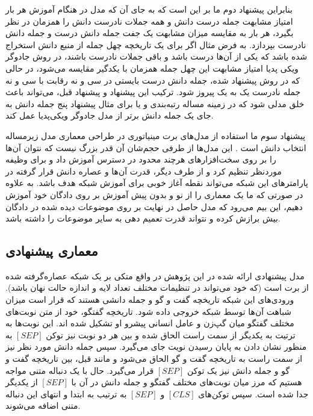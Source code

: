 بنابراین پیشنهاد دوم ما بر این است که به جای آن که مدل در هنگام آموزش هر بار امتیاز مشابهت جمله درست دانش و همه جملات نادرست دانش را همزمان در نظر بگیرد، هر بار به مقایسه میزان مشابهت یک جفت جمله دانش درست و جمله دانش نادرست بپردازد. به فرض مثال اگر برای یک تاریخچه چهل جمله از منبع دانش استخراج شده باشد که یکی از آن‌ها درست باشد و باقی جملات نادرست باشند، در روش جادوگر ویکی پدیا امتیاز مشابهت این چهل جمله همزمان با یکدگیر مقایسه می‌شود، در حالی که در روش پیشنهاد شده، جمله دانش درست بایستی در سی و نه رقابت با سی و نه جمله نادرست یک به یک پیروز شود. ترکیب این پیشنهاد 
و پیشنهاد قبل، می‌تواند باعث خلق مدلی شود که در زمینه مساله رتبه‌بندی 
و یا برای مثال پیشنهاد پنج جمله دانش به جای یک جمله دانش
برتر از مدل جادوگر ویکی‌پدیا عمل کند.

پیشنهاد سوم ما استفاده از مدل‌های برت مینیاتوری در طراحی معماری مدل زیرمساله انتخاب دانش است
\cite{turc2019well}.
این مدل‌ها از طرفی حجم‌شان آن قدر بزرگ نیست که نتوان آن‌ها را بر روی سخت‌افزار‌های هرچند محدود در دسترس آموزش داد و برای وظیفه موردنظر تنظیم کرد و از طرف دیگر، قدرت آ‌ن‌ها و عصاره دانش قرار گرفته در پارامتر‌های این شبکه می‌تواند نقطه آغاز خوبی برای آموزش شبکه هدف باشد. به علاوه در صورتی که ما یک معماری را از نو و بدون پیش آموزش بر روی دادگان خود آموزش دهیم، این بیم می‌رود که مدل حاصل در نهایت بر روی موضوعات دیده شده در دادگان بیش برازش کرده و نتواند قدرت تعمیم دهی به سایر موضوعات را داشته باشد. 

\subsection{معماری پیشنهادی}\label{chap4:knowledge_selction:arch}

مدل پیشنهادی ارائه شده در این پژوهش در واقع  متکی بر یک شبکه عصاره‌‌گرفته شده از برت است (که خود می‌تواند در تنظیمات مختلف تعداد لایه و اندازه حالت نهان باشد). 
ورودی‌های این شبکه تاریخچه گفت و گو و جمله دانشی هستند که قرار است میزان شباهت آن‌ها توسط شبکه خروجی داده شود. تاریخچه گفتگو، خود از متن نوبت‌های مختلف گفتگو میان گپ‌زن و عامل انسانی پیشرو او تشکیل شده اند. این نوبت‌ها به ترتیت به یکدیگر از سمت راست الحاق شده و بین هر دو نوبت نیز توکن 
$[SEP]$
به منظور نشان دادن به پایان رسیدن نویت جای می‌گیرد. سپس جمله دانش مورد نظر نیز از سمت راست به تاریخچه گفت و گو الحاق می‌شود و مانند قبل، بین تاریخچه گفت و گو و جمله دانش نیز یک توکن 
$[SEP]$
قرار می‌گیرد. حال با یک دنباله متنی مواجه هستیم که مرز میان نوبت‌های مختلف گفتگو و جمله دانش در آن با 
$[SEP]$
از یکدیگر جدا شده است. سپس توکن‌های 
$[CLS]$
و 
$[SEP]$
به ترتیب به ابتدا و انتهای این دنباله متنی اضافه می‌شوند. 

